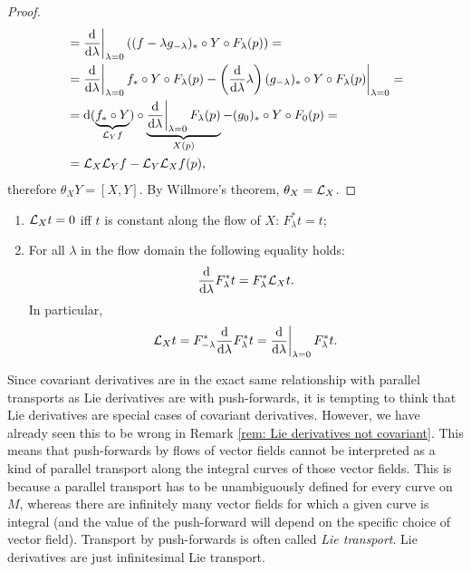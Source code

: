 \begin{proof}
\begin{align}
        &=\restr{\frac{\dd}{\dd \lambda}}{\lambda=0} \left((f-\lambda g_{-\lambda})_\ast\circ Y\circ F_\lambda(p)\right)=\\
        &=\restr{\frac{\dd}{\dd \lambda}}{\lambda=0} f_\ast\circ Y\circ F_\lambda (p)-\restr{\left(\frac{\dd}{\dd \lambda}\lambda\right)(g_{-\lambda})_\ast\circ Y\circ F_\lambda(p)}{\lambda=0}=\\
        &=\dd(\underbrace{f_\ast\circ Y}_{\Lie_Yf})\circ \underbrace{\restr{\frac{\dd}{\dd \lambda}}{\lambda=0} F_\lambda(p)}_{X(p)}-(g_0)_\ast \circ Y\circ F_0(p)=\\
        &=\Lie_X\Lie_Y f-\Lie_Y\Lie_X f(p),
    \end{align}
    therefore $\theta_X Y=[X,Y]$. By Willmore's theorem, $\theta_X=\mathcal{L}_X$.
\end{proof}
\begin{cor}
\begin{enumerate}
    \item $\mathcal{L}_X t=0$ iff $t$ is constant along the flow of $X$: $F^\ast_\lambda t=t$;
    \item For all $\lambda$ in the flow domain the following equality holds:
    \[\frac{{\mathrm{d}}}{{\mathrm{d}} \lambda}F^\ast_\lambda t=F^\ast_\lambda \mathcal{L}_X t.\]
    In particular, 
    \[\Lie_X t=F^\ast_{-\lambda} \frac{\dd}{\dd \lambda}F^\ast_\lambda t=\restr{\frac{\dd}{\dd\lambda}}{\lambda=0}F^\ast_\lambda t.\]
\end{enumerate}
\end{cor}

\begin{rem}
    Since covariant derivatives are in the exact same relationship with parallel transports as Lie derivatives are with push-forwards, it is tempting to think that Lie derivatives are special cases of covariant derivatives. However, we have already seen this to be wrong in Remark \ref{rem: Lie derivatives not covariant}. This means that push-forwards by flows of vector fields cannot be interpreted as a kind of parallel transport along the integral curves of those vector fields. This is because a parallel transport has to be unambiguously defined for every curve on $M$, whereas there are infinitely many vector fields for which a given curve is integral (and the value of the push-forward will depend on the specific choice of vector field). Transport by push-forwards is often called \emph{Lie transport}. Lie derivatives are just infinitesimal Lie transport.
\end{rem}

